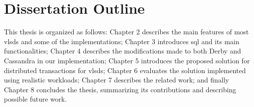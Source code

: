 \section{Dissertation Outline}

This thesis is organized as follows: Chapter 2 describes the main features of most \acp{vlsd} and some of the implementations; Chapter 3 introduces \ac{sql} and its main functionalities; Chapter 4 describes the modifications made to both Derby and Cassandra in our implementation; Chapter 5 introduces the proposed solution for distributed transactions for \acp{vlsd}; Chapter 6 evaluates the solution implemented using realistic workloads; Chapter 7 describes the related work; and finally Chapter 8 concludes the thesis, summarizing its contributions and describing possible future work. 
